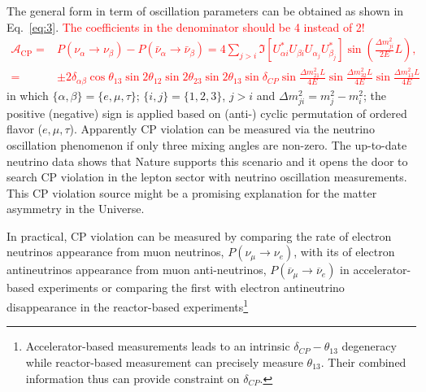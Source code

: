 \documentclass[a4 paper,12pt]{report}%
\begin{document}
The general form in term of oscillation parameters can be obtained as shown in Eq.~\ref{eq:3}. \textcolor{red}{The coefficients in the denominator should be 4 instead of 2!
\noindent 
   \begin{align}\label{eq:3}
\mathcal{A}_{\text{CP}}=&P(\nu_\alpha \rightarrow \nu_\beta)-P(\bar\nu_\alpha \rightarrow \bar\nu_\beta) 
= 4\sum_{j>i}\Im\left[U^*_{\alpha i}U_{\beta i}U_{\alpha_j}U^*_{\beta_j}\right]\sin\left(\frac{\Delta m^2_{ji}}{2E}L\right), \nonumber \\
=&\pm 2 \delta_{\alpha \beta} \cos \theta_{13} \sin 2\theta_{12} \sin 2\theta_{23} \sin 2\theta_{13} \sin \delta_{CP} \sin \frac{\Delta m^2_{21}L}{4E}  \sin \frac{\Delta m^2_{32} L}{4E}  \sin \frac{\Delta m^2_{13} L }{4E}
   \end{align}}
in which $\{\alpha, \beta\} = \{e, \mu, \tau\}$; $\{i, j\} = \{1, 2, 3\}$, $j > i$ and $\Delta m^2_{ji} = m^2_j - m^2_i$; the positive (negative) sign is applied based on (anti-) cyclic permutation of ordered flavor ($e,\mu,\tau$). Apparently CP violation can be measured via the neutrino oscillation phenomenon if only three mixing angles are non-zero. The up-to-date neutrino data shows that Nature supports this scenario and it opens the door to search CP violation in the lepton sector with neutrino oscillation measurements. This CP violation source might be a promising explanation for the matter asymmetry in the Universe. \par


In practical, CP violation can be measured by comparing the rate of electron neutrinos appearance from muon neutrinos, $P(\nu_\mu \rightarrow \nu_e)$, with its of electron antineutrinos appearance from muon anti-neutrinos, $P(\overline{\nu}_\mu \rightarrow \overline{\nu}_e)$ in accelerator-based experiments or comparing the first with electron antineutrino disappearance in the reactor-based experiments\footnote{Accelerator-based measurements leads to an intrinsic $\delta_{CP}-\theta_{13}$ degeneracy while reactor-based measurement can precisely measure $\theta_{13}$. Their combined information thus can provide constraint on $\delta_{CP}$.}
\end{document}
